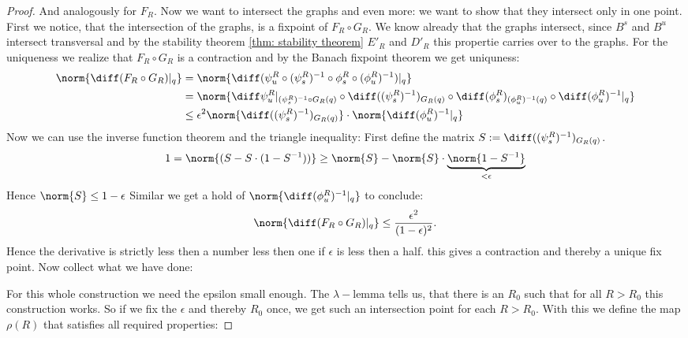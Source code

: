 \begin{proof}
	And analogously for $F_R$. Now we want to intersect the graphs and even more: we want to show that they intersect only in one point. First we notice, that the intersection of the graphs, is a fixpoint of $F_R\circ G_R$. We know already that the graphs intersect, since $B^s$ and $B^u$ intersect transversal and by the stability theorem \ref{thm: stability theorem} $E'_R$ and $D'_R$ this propertie carries over to the graphs. For the uniqueness we realize that $F_R\circ G_R$ is a contraction and by the Banach fixpoint theorem we get uniquness:
	\begin{align*}
		\norm{\diff (F_R\circ G_R)|_q}&=\norm{\diff (\psi^R_u \circ (\psi^R_s)^{-1}\circ \phi^R_s \circ (\phi^R_u)^{-1})|_q} \\
		&=\norm{\diff \psi^R_u|_{(\psi^R_s)^{-1}\circ G_R(q)}\circ \diff ((\psi^R_s)^{-1})_{G_R(q)}\circ \diff (\phi^R_s)_{(\phi^R_u)^{-1}(q)}\circ \diff (\phi^R_u)^{-1}|_q}\\
		&\leq \epsilon^2\norm{\diff ((\psi^R_s)^{-1})_{G_R(q)}}\cdot \norm{\diff (\phi^R_u)^{-1}|_q} \\
	\end{align*} Now we can use the inverse function theorem and the triangle inequality: First define the matrix $S:=\diff ((\psi^R_s)^{-1})_{G_R(q)}$.
	\begin{align*}
		1=\norm{(S-S\cdot (1-S^{-1}))}\geq \norm{S}-\norm{S}\cdot \underbrace{\norm{1-S^{-1}}}_{<\epsilon} 
	\end{align*} Hence $\norm{S}\leq 1-\epsilon$ Similar we get a hold of $\norm{\diff (\phi^R_u)^{-1}|_q}$ to conclude:
	\begin{align*}
		\norm{\diff (F_R\circ G_R)|_q}\leq \frac{\epsilon^2}{(1-\epsilon)^2}.
	\end{align*}Hence the derivative is strictly less then a number less then one if $\epsilon$ is less then a half. this gives a contraction and thereby a unique fix point. Now collect what we have done: 
	
	For this whole construction we need the epsilon small enough. The $\lambda-$lemma tells us, that there is an $R_0$ such that for all $R>R_0$ this construction works. So if we fix the $\epsilon$ and thereby $R_0$ once, we get such an intersection point for each $R>R_0$. With this we define the map $\rho(R)$ that satisfies all required properties:
	

\end{proof}
